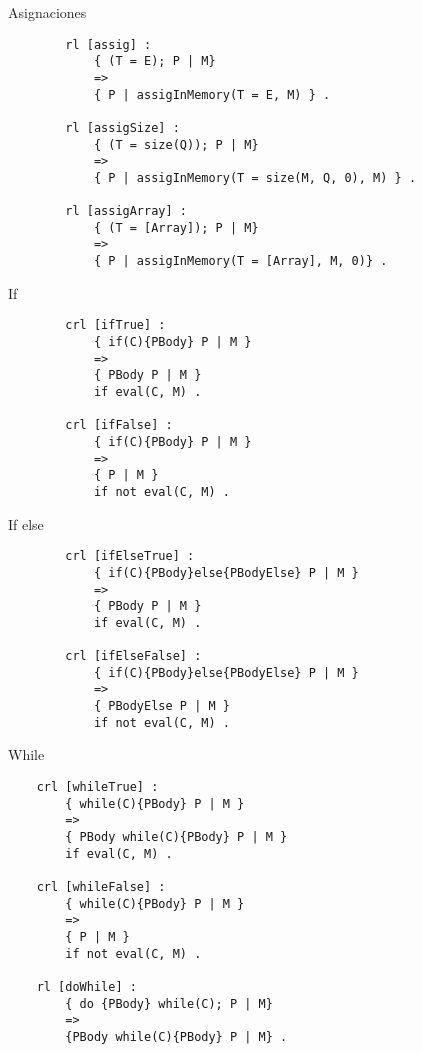 \documentclass{beamer}
\begin{document}
    \begin{frame}[fragile]{Asignaciones}
        \begin{verbatim}  
        rl [assig] : 
            { (T = E); P | M}
            =>
            { P | assigInMemory(T = E, M) } .

        rl [assigSize] : 
            { (T = size(Q)); P | M}
            =>
            { P | assigInMemory(T = size(M, Q, 0), M) } .
        
        rl [assigArray] :
            { (T = [Array]); P | M}
            =>
            { P | assigInMemory(T = [Array], M, 0)} .
        \end{verbatim}
    \end{frame}

    \begin{frame}[fragile]{If}
        \begin{verbatim}  
        crl [ifTrue] :
            { if(C){PBody} P | M }
            => 
            { PBody P | M } 
            if eval(C, M) .
    
        crl [ifFalse] :
            { if(C){PBody} P | M }
            => 
            { P | M } 
            if not eval(C, M) .
        \end{verbatim}
    \end{frame}

    \begin{frame}[fragile]{If else}
        \begin{verbatim}  
        crl [ifElseTrue] :
            { if(C){PBody}else{PBodyElse} P | M }
            => 
            { PBody P | M } 
            if eval(C, M) .
    
        crl [ifElseFalse] :
            { if(C){PBody}else{PBodyElse} P | M }
            => 
            { PBodyElse P | M } 
            if not eval(C, M) .
        \end{verbatim}
    \end{frame}

    \begin{frame}[fragile]{While}
        \begin{verbatim}  
    crl [whileTrue] :
        { while(C){PBody} P | M }
        => 
        { PBody while(C){PBody} P | M } 
        if eval(C, M) .

    crl [whileFalse] :
        { while(C){PBody} P | M }
        => 
        { P | M } 
        if not eval(C, M) .

    rl [doWhile] :
        { do {PBody} while(C); P | M}
        =>
        {PBody while(C){PBody} P | M} .
        \end{verbatim}
    \end{frame}
\end{document}

